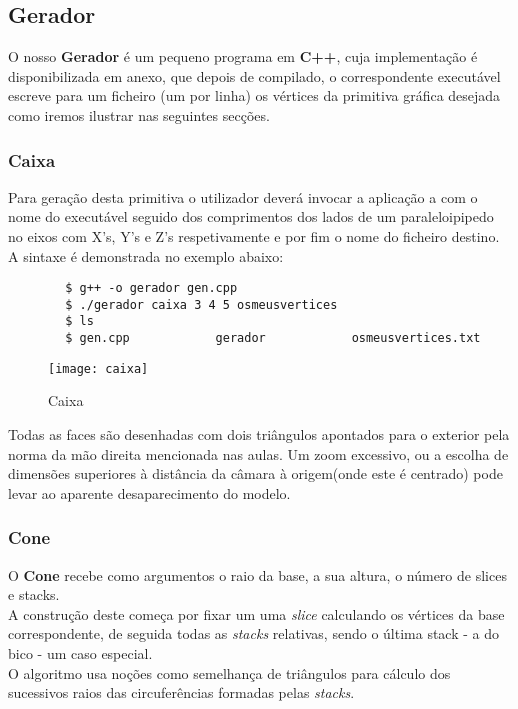 \documentclass{article}
\begin{document}
\subsection{Gerador}
O nosso \textbf{Gerador} é um pequeno programa em \textbf{C++}, cuja implementação é disponibilizada em anexo, que depois de compilado, o correspondente executável escreve para um ficheiro (um por linha) os vértices da primitiva gráfica desejada  como iremos ilustrar nas seguintes secções.


\subsubsection{Caixa}
Para geração desta primitiva o utilizador deverá invocar a aplicação a com o nome do executável seguido dos comprimentos dos lados de um paraleloipipedo no eixos com X’s, Y’s e Z’s respetivamente e por fim o nome do ficheiro destino. A sintaxe é demonstrada no exemplo abaixo:

\begin{commandline}
    \begin{verbatim}
        $ g++ -o gerador gen.cpp
        $ ./gerador caixa 3 4 5 osmeusvertices
        $ ls
        $ gen.cpp            gerador            osmeusvertices.txt
    \end{verbatim}
\end{commandline}

\begin{figure}[H]
	\centering
	\texttt{[image: caixa]}
	\caption{Caixa}
\end{figure}

\begin{warn}[Notice:]
Todas as faces são desenhadas com dois triângulos apontados para o exterior pela norma da mão direita mencionada nas aulas. Um zoom excessivo, ou a escolha de dimensões superiores à distância da câmara à origem(onde este é centrado)  pode levar ao aparente desaparecimento do modelo.
\end{warn}

\subsubsection{Cone}
O \textbf{Cone} recebe como argumentos o raio da base, a sua altura, o número de slices e stacks. \\
A construção deste começa por fixar um uma \textit{slice} calculando os vértices da base correspondente, de seguida todas as \textit{stacks} relativas, sendo o última stack - a do bico - um caso especial. \\
O algoritmo usa noções como semelhança de triângulos para cálculo dos sucessivos raios das circuferências formadas pelas \textit{stacks}.\\
\end{document}
